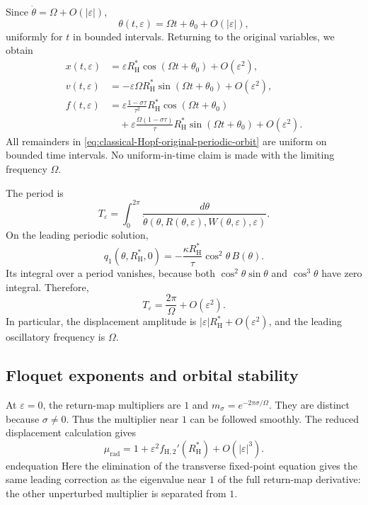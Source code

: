 \documentclass[11pt,reqno]{amsart}
\theoremstyle{plain}
\theoremstyle{definition}
\theoremstyle{remark}
\begin{document}
Since $\dot\theta=\Omega+O(|\varepsilon|)$,
\[
\theta(t,\varepsilon)
=
\Omega t+\theta_0+O(|\varepsilon|),
\]
uniformly for $t$ in bounded intervals. Returning to the
original variables, we obtain
\begin{equation}
\label{eq:classical-Hopf-original-periodic-orbit}
\begin{aligned}
x(t,\varepsilon)
&=
\varepsilon R_{\mathrm H}^*
\cos(\Omega t+\theta_0)
+O(\varepsilon^2),\\
v(t,\varepsilon)
&=
-\varepsilon\Omega R_{\mathrm H}^*
\sin(\Omega t+\theta_0)
+O(\varepsilon^2),\\
f(t,\varepsilon)
&=
\varepsilon\frac{1-\sigma\tau}{\tau^2}
R_{\mathrm H}^*\cos(\Omega t+\theta_0)\\
&\quad+
\varepsilon\frac{\Omega(1-\sigma\tau)}{\tau}
R_{\mathrm H}^*\sin(\Omega t+\theta_0)
+O(\varepsilon^2).
\end{aligned}
\end{equation}
All remainders in
\eqref{eq:classical-Hopf-original-periodic-orbit} are
uniform on bounded time intervals. No uniform-in-time
claim is made with the limiting frequency $\Omega$.

The period is
\[
T_\varepsilon
=
\int_0^{2\pi}
\frac{d\theta}
{\dot\theta(\theta,R(\theta,\varepsilon),
W(\theta,\varepsilon),\varepsilon)}.
\]
On the leading periodic solution,
\[
q_1(\theta,R_{\mathrm H}^*,0)
=
-\frac{\kappa R_{\mathrm H}^*}{\tau}
\cos^2\theta\,B(\theta).
\]
Its integral over a period vanishes, because both
$\cos^2\theta\sin\theta$ and $\cos^3\theta$ have zero
integral. Therefore,
\begin{equation}
\label{eq:classical-Hopf-period}
T_\varepsilon
=
\frac{2\pi}{\Omega}
+O(\varepsilon^2).
\end{equation}
In particular, the displacement amplitude is
$|\varepsilon|R_{\mathrm H}^*+O(\varepsilon^2)$,
and the leading oscillatory frequency is $\Omega$.

\subsection{Floquet exponents and orbital stability}
\label{subsec:classical-Hopf-stability}

At $\varepsilon=0$, the return-map multipliers are
$1$ and $m_\sigma=e^{-2\pi\sigma/\Omega}$.
They are distinct because $\sigma\neq0$.
Thus the multiplier near $1$ can be followed smoothly.
The reduced displacement calculation gives
\[
\mu_{\mathrm{rad}}
=
1+\varepsilon^2
f_{\mathrm H,2}'(R_{\mathrm H}^*)
+O(|\varepsilon|^3).
\]end{equation}
Here the elimination of the transverse fixed-point
equation gives the same leading correction as the
eigenvalue near $1$ of the full return-map derivative:
the other unperturbed multiplier is separated from $1$.
\end{document}
